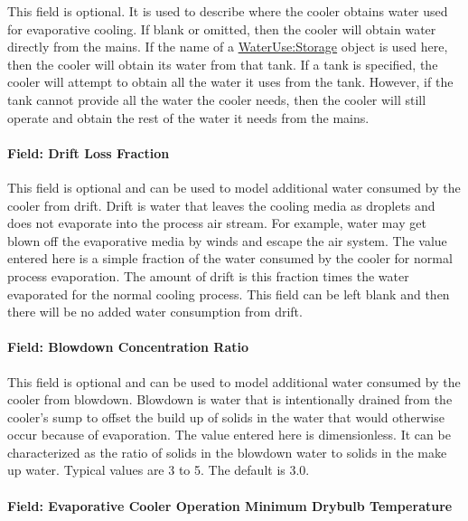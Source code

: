 This field is optional. It is used to describe where the cooler obtains water used for evaporative cooling. If blank or omitted, then the cooler will obtain water directly from the mains. If the name of a \hyperref[waterusestorage]{WaterUse:Storage} object is used here, then the cooler will obtain its water from that tank. If a tank is specified, the cooler will attempt to obtain all the water it uses from the tank. However, if the tank cannot provide all the water the cooler needs, then the cooler will still operate and obtain the rest of the water it needs from the mains.

\paragraph{Field: Drift Loss Fraction}\label{field-drift-loss-fraction}

This field is optional and can be used to model additional water consumed by the cooler from drift. Drift is water that leaves the cooling media as droplets and does not evaporate into the process air stream. For example, water may get blown off the evaporative media by winds and escape the air system. The value entered here is a simple fraction of the water consumed by the cooler for normal process evaporation. The amount of drift is this fraction times the water evaporated for the normal cooling process. This field can be left blank and then there will be no added water consumption from drift.

\paragraph{Field: Blowdown Concentration Ratio}\label{field-blowdown-concentration-ratio-000}

This field is optional and can be used to model additional water consumed by the cooler from blowdown. Blowdown is water that is intentionally drained from the cooler's sump to offset the build up of solids in the water that would otherwise occur because of evaporation. The value entered here is dimensionless. It can be characterized as the ratio of solids in the blowdown water to solids in the make up water. Typical values are 3 to 5. The default is 3.0.

\paragraph{Field: Evaporative Cooler Operation Minimum Drybulb Temperature}\label{field-evaporative-cooler-operation-minimum-drybulb-temperature}

